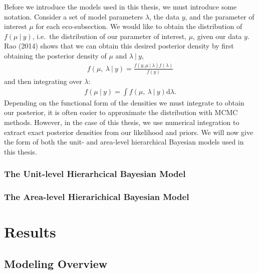 \documentclass[12pt,twoside]{reedthesis}
\begin{document}
Before we introduce the models used in this thesis, we must introduce some notation. Consider a set of model parameters \(\lambda\), the data \(y\), and the parameter of interest \(\mu\) for each eco-subsection. We would like to obtain the distribution of \(f(\mu ~\vert~ y)\), i.e.~the distribution of our parameter of interest, \(\mu\), given our data \(y\). Rao (2014) shows that we can obtain this desired posterior density by first obtaining the posterior density of \(\mu\) and \(\lambda ~\vert~ y\),
\begin{align}
f(\mu,~ \lambda ~\vert~ y) = \frac{f(y, \mu ~\vert~ \lambda) f(\lambda)}{f(y)}
\end{align}
and then integrating over \(\lambda\):
\begin{align}
f(\mu ~\vert~ y) = \int f(\mu,~ \lambda ~\vert~ y) \text{d}\lambda.
\end{align}
Depending on the functional form of the densities we must integrate to obtain our posterior, it is often easier to approximate the distribution with MCMC methods. However, in the case of this thesis, we use numerical integration to extract exact posterior densities from our likelihood and priors. We will now give the form of both the unit- and area-level hierarchical Bayesian models used in this thesis.

\hypertarget{the-unit-level-hierarhcical-bayesian-model}{%
\subsection{The Unit-level Hierarhcical Bayesian Model}\label{the-unit-level-hierarhcical-bayesian-model}}

\hypertarget{the-area-level-hierarichical-bayesian-model}{%
\subsection{The Area-level Hierarichical Bayesian Model}\label{the-area-level-hierarichical-bayesian-model}}

\hypertarget{results}{%
\chapter{Results}\label{results}}

\hypertarget{modeling-overview}{%
\section{Modeling Overview}\label{modeling-overview}}
\end{document}
